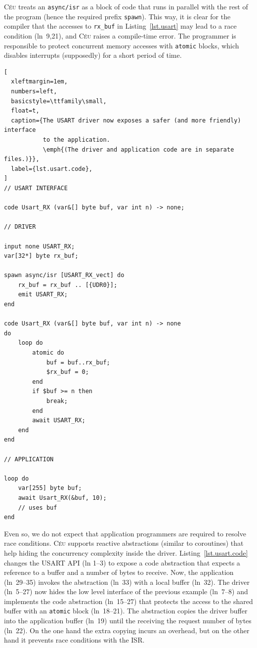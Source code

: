 \documentclass[sigplan,10pt,review,anonymous]{acmart}\settopmatter{printfolios=true,printccs=false,printacmref=false}
\newcommand{\CEU}{\textsc{C\'{e}u}\xspace}
\newcommand{\code}[1] {{\small{\texttt{#1}}}}
\begin{document}
\CEU treats an \code{async/isr} as a block of code that runs in parallel with
the rest of the program (hence the required prefix \code{spawn}).
%
This way, it is clear for the compiler that the accesses to \code{rx\_buf} in
Listing~\ref{lst.usart} may lead to a race condition (ln~9,21), and \CEU raises
a compile-time error.
%
The programmer is responsible to protect concurrent memory accesses with
\code{atomic} blocks, which disables interrupts (supposedly) for a short period
of time.

\begin{lstlisting}[
  xleftmargin=1em,
  numbers=left,
  basicstyle=\ttfamily\small,
  float=t,
  caption={The USART driver now exposes a safer (and more friendly) interface
           to the application.
           \emph{(The driver and application code are in separate files.)}},
  label={lst.usart.code},
]
// USART INTERFACE

code Usart_RX (var&[] byte buf, var int n) -> none;

// DRIVER

input none USART_RX;
var[32*] byte rx_buf;

spawn async/isr [USART_RX_vect] do
    rx_buf = rx_buf .. [{UDR0}];
    emit USART_RX;
end

code Usart_RX (var&[] byte buf, var int n) -> none
do
    loop do
        atomic do
            buf = buf..rx_buf;
            $rx_buf = 0;
        end
        if $buf >= n then
            break;
        end
        await USART_RX;
    end
end

// APPLICATION

loop do
    var[255] byte buf;
    await Usart_RX(&buf, 10);
    // uses buf
end
\end{lstlisting}

Even so, we do not expect that application programmers are required to resolve
race conditions.
\CEU supports reactive abstractions (similar to coroutines) that help hiding
the concurrency complexity inside the driver.
%
Listing~\ref{lst.usart.code} changes the USART API (ln 1--3) to expose a code
abstraction that expects a reference to a buffer and a number of bytes to
receive.
Now, the application (ln~29--35) invokes the abstraction (ln~33) with a local
buffer (ln~32).
%
The driver (ln~5--27) now hides the low level interface of the previous example
(ln~7--8) and implements the code abstraction (ln~15--27) that protects the
access to the shared buffer with an \code{atomic} block (ln~18--21).
%
The abstraction copies the driver buffer into the application buffer (ln~19)
until the receiving the request number of bytes (ln~22).
%
On the one hand the extra copying incurs an overhead, but on the other hand it
prevents race conditions with the ISR.
\end{document}
